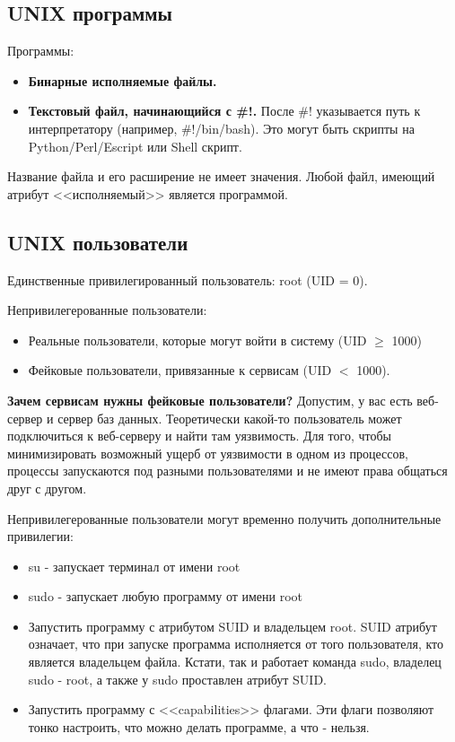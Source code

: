 \subsection{UNIX программы}

Программы:
\begin{itemize}
	\item \textbf{Бинарные исполняемые файлы.}
	\item \textbf{Текстовый файл, начинающийся с \#!.} После \#! указывается путь к интерпретатору (например, \#!/bin/bash). Это могут быть скрипты на Python/Perl/Escript или Shell скрипт.
\end{itemize}

Название файла и его расширение не имеет значения. Любой файл, имеющий атрибут 
<<исполняемый>> является программой.

\subsection{UNIX пользователи}

Единственные привилегированный пользователь: root (UID = 0).

Непривилегерованные пользователи:
\begin{itemize}
	\item Реальные пользователи, которые могут войти в систему (UID $\ge$ 1000)
	\item Фейковые пользователи, привязанные к сервисам (UID $<$ 1000).
\end{itemize}

\textbf{Зачем сервисам нужны фейковые пользователи?}
Допустим, у вас есть веб-сервер и сервер баз данных. Теоретически какой-то пользователь
может подключиться к веб-серверу и найти там уязвимость. Для того, чтобы 
минимизировать возможный ущерб от уязвимости в одном из процессов, процессы запускаются
под разными пользователями и не имеют права общаться друг с другом.

Непривилегерованные пользователи могут временно получить 
дополнительные привилегии:

\begin{itemize}
	\item su - запускает терминал от имени root
	\item sudo - запускает любую программу от имени root
	\item Запустить программу с атрибутом SUID и владельцем root. SUID атрибут означает, что при запуске программа
	исполняется от того пользователя, кто является владельцем файла. Кстати, так и 
	работает команда sudo, владелец sudo - root, а также у sudo проставлен атрибут SUID.
	\item Запустить программу с <<capabilities>> флагами. Эти флаги позволяют тонко настроить, что можно делать программе, а что - нельзя.
\end{itemize}

